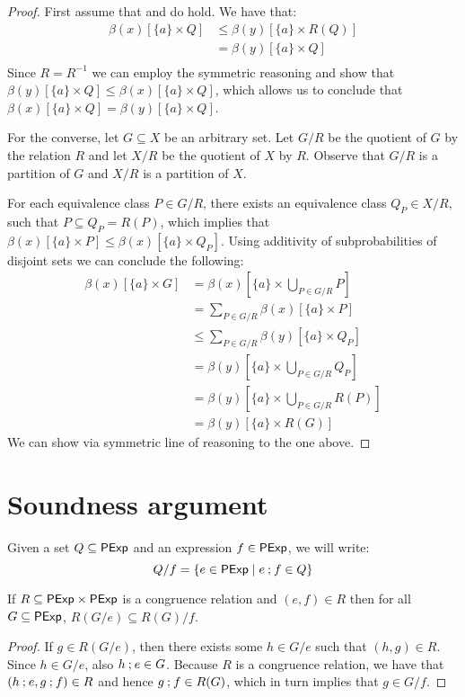 \begin{proof}
    First assume that  and  do hold.
    We have that:
    \begin{align*}
        \beta(x)[\{a\} \times Q] &\leq \beta(y)[\{a\} \times R(Q)] \\
        &= \beta(y)[\{a\} \times Q] \tag{$R$ is an equivalence relation}\\
    \end{align*}
    Since $R=R^{-1}$ we can employ the symmetric reasoning and show that $\beta(y)[\{a\} \times Q]\leq\beta(x)[\{a\} \times Q]$, which allows us to conclude that $\beta(x)[\{a\} \times Q]=\beta(y)[\{a\} \times Q]$.

    For the converse, let $G \subseteq X$ be an arbitrary set. 
    Let \(G / {R}\) be the quotient of \(G\) by the relation \(R\) and let \(X / {R}\) be the quotient of \(X\) by \(R\).
    Observe that \(G / {R}\) is a partition of \(G\) and \(X / {R}\) is a partition of \(X\).

    For each equivalence class \(P \in G / {R}\), there exists an equivalence class \(Q_P \in X / {R}\), such that \(P \subseteq Q_P = R(P)\), which implies that \(\beta(x)[\{a\} \times P] \leq \beta(x)[\{a\} \times Q_P]\).
    Using additivity of subprobabilities of disjoint sets we can conclude the following:
	\begin{align*}
		\beta(x)[\{a\} \times G] &= \beta(x)\left[\{a\} \times \bigcup_{P \in G / {R}} P \right] \\
        &= \sum_{P \in G / {R}} \beta(x)[\{a\} \times P]\\
        &\leq \sum_{P \in G / {R}} \beta(y)[\{a\} \times Q_P]\\
        &= \beta(y)\left[\{a\} \times \bigcup_{P \in G / {R}} Q_P\right]\\
        &= \beta(y)\left[\{a\} \times \bigcup_{P \in G / {R}} R(P)\right]\\
        &= \beta(y)[\{a\} \times R(G)]
	\end{align*}
    We can show  via symmetric line of reasoning to the one above.
\end{proof}
\section{Soundness argument}
Given a set $Q \subseteq \mathsf{PExp}$ and an expression $f \in \mathsf{PExp}$, we will write: 
$$
{Q}/{f} = \{e \in \mathsf{PExp} \mid e \mathbin{;} f \in Q\}
$$
\begin{lemma}\label{apx:lem:cutting_postfixes}
    If \(R \subseteq \mathsf{PExp} \times \mathsf{PExp}\) is a congruence relation and \(({e}, {f}) \in R\) then for all $G \subseteq \mathsf{PExp}$, \(R(G / {{e}}) \subseteq R(G) / {f} \).
\end{lemma}
\begin{proof}
    If \({g} \in  R(G / {e})\), then there exists some \({h} \in G / {e}\) such that \(({h}, {g})\in R\).
    Since \({h} \in G / {e}\), also \({h} \mathbin{;} {e} \in G\).
    Because \(R\) is a congruence relation, we have that \(({h}\mathbin{;} {e}, {g}\mathbin{;} {f})\in R\) and hence \({g}\mathbin{;} {f} \in R(G)\), which in turn implies that \({g} \in G / {f}\).
\end{proof}

